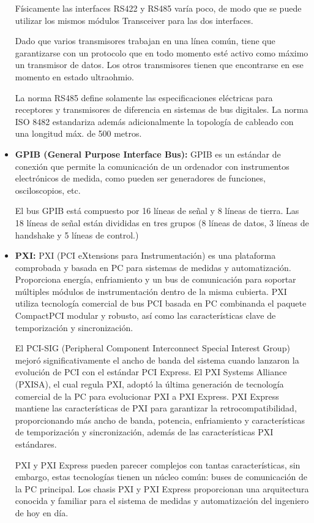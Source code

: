 \documentclass[12pt,letterpaper, onecolumn, titlepage, oneside]{book}
\begin{document}
\begin{itemize}
    Físicamente las interfaces RS422 y RS485 varía poco, de modo que se puede utilizar los mismos módulos Transceiver para las dos interfaces. 
    
    Dado que varios transmisores trabajan en una línea común, tiene que garantizarse con un protocolo que en todo momento esté activo como máximo un transmisor de datos. Los otros transmisores tienen que encontrarse en ese momento en estado ultraohmio.
    
    La norma RS485 define solamente las especificaciones eléctricas para receptores y transmisores de diferencia en sistemas de bus digitales. La norma ISO 8482 estandariza además adicionalmente la topología de cableado con una longitud máx. de 500 metros.
    
    \item \textbf{GPIB (General Purpose Interface Bus):} GPIB es un estándar de conexión que permite la comunicación de un ordenador con instrumentos electrónicos de medida, como pueden ser generadores de funciones, osciloscopios, etc.
    
    El bus GPIB está compuesto por 16 líneas de señal y 8 líneas de tierra. Las 18 líneas de señal están divididas en tres grupos (8 líneas de datos, 3 líneas de handshake y 5 líneas de control.)
    
    \item \textbf{PXI:} PXI (PCI eXtensions para Instrumentación) es una plataforma comprobada y basada en PC para sistemas de medidas y automatización. Proporciona energía, enfriamiento y un bus de comunicación para soportar múltiples módulos de instrumentación dentro de la misma cubierta. PXI utiliza tecnología comercial de bus PCI basada en PC combinanda el paquete CompactPCI modular y robusto, así como las características clave de temporización y sincronización.
    
    El PCI-SIG (Peripheral Component Interconnect Special Interest Group) mejoró significativamente el ancho de banda del sistema cuando lanzaron la evolución de PCI con el estándar PCI Express. El PXI Systems Alliance (PXISA), el cual regula PXI, adoptó la última generación de tecnología comercial de la PC para evolucionar PXI a PXI Express. PXI Express mantiene las características de PXI para garantizar la retrocompatibilidad, proporcionando más ancho de banda, potencia, enfriamiento y características de temporización y sincronización, además de las características PXI estándares.
    
    PXI y PXI Express pueden parecer complejos con tantas características, sin embargo, estas tecnologías tienen un núcleo común: buses de comunicación de la PC principal. Los chasis PXI y PXI Express proporcionan una arquitectura conocida y familiar para el sistema de medidas y automatización del ingeniero de hoy en día.
    

\end{itemize}
\end{document}
